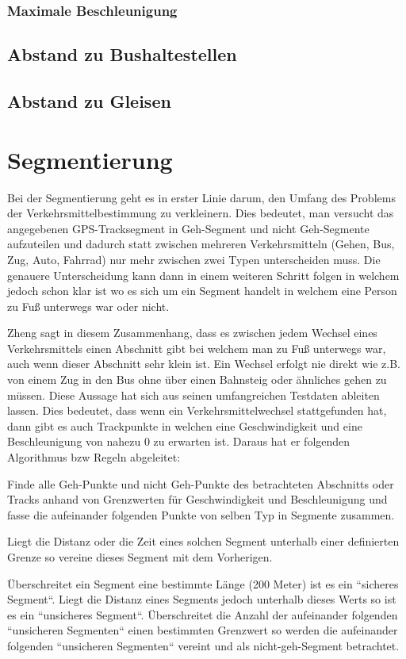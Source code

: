 \subsubsection{Maximale Beschleunigung}
\subsection{Abstand zu Bushaltestellen}
\subsection{Abstand zu Gleisen}
\clearpage

\section{Segmentierung}
\label{segmentierung}
Bei der Segmentierung geht es in erster Linie darum, den Umfang des Problems der Verkehrsmittelbestimmung zu verkleinern. Dies bedeutet, man versucht das angegebenen GPS-Tracksegment in Geh-Segment und nicht Geh-Segmente aufzuteilen und dadurch statt zwischen mehreren Verkehrsmitteln (Gehen, Bus, Zug, Auto, Fahrrad) nur mehr zwischen zwei Typen unterscheiden muss. Die genauere Unterscheidung kann dann in einem weiteren Schritt folgen in welchem jedoch schon klar ist wo es sich um ein Segment handelt in welchem eine Person zu Fuß unterwegs war oder nicht. 

Zheng sagt in diesem Zusammenhang, dass es zwischen jedem Wechsel eines Verkehrsmittels einen Abschnitt gibt bei welchem man zu Fuß unterwegs war, auch wenn dieser Abschnitt sehr klein ist. Ein Wechsel erfolgt nie direkt wie z.B. von einem Zug in den Bus ohne über einen Bahnsteig oder ähnliches gehen zu müssen. Diese Aussage hat sich aus seinen umfangreichen Testdaten ableiten lassen. Dies bedeutet, dass wenn ein Verkehrsmittelwechsel stattgefunden hat, dann gibt es auch Trackpunkte in welchen eine Geschwindigkeit und eine Beschleunigung von nahezu 0 zu erwarten ist. Daraus hat er folgenden Algorithmus bzw Regeln abgeleitet:  \cite{zheng_understanding_2010}

\begin{pitemize}
\item Finde alle Geh-Punkte und nicht Geh-Punkte des betrachteten Abschnitts oder Tracks anhand von Grenzwerten für Geschwindigkeit und Beschleunigung und fasse die aufeinander folgenden Punkte von selben Typ in Segmente zusammen.
\item Liegt die Distanz oder die Zeit eines solchen Segment unterhalb einer definierten Grenze so vereine dieses Segment mit dem Vorherigen.
\item Überschreitet ein Segment eine bestimmte Länge (200 Meter) ist es ein ``sicheres Segment``. Liegt die Distanz eines Segments jedoch unterhalb dieses Werts so ist es ein ``unsicheres Segment``. Überschreitet die Anzahl der aufeinander folgenden ``unsicheren Segmenten`` einen bestimmten Grenzwert so werden die  aufeinander folgenden ``unsicheren Segmenten`` vereint und als nicht-geh-Segment betrachtet.
\end{pitemize}

